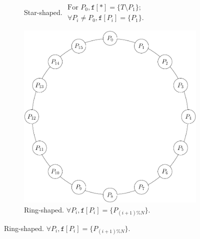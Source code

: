 \documentclass{article}
\begin{document}
\begin{figure}
\begin{subfigure}[t]{0.3\textwidth}
    \caption{Star-shaped.  \newline $\begin{array}{l} \mbox{For $P_0$}, \mathtt{f}[*] = \{T\setminus P_1\}; \\ \mbox{$\forall P_i\neq P_0$}, \mathtt{f}[P_i] = \{P_1\}. \end{array}$}
    \label{fig:star}
  \end{subfigure}
  \hfill
  \begin{subfigure}[t]{0.3\textwidth}
    \centering
    \includegraphics[width=\textwidth]{ring}
    \caption{Ring-shaped. \newline $\forall P_i, \mathtt{f}[P_i]=\{P_{(i+1)\%N}\}$.}
    \label{fig:ring}
  \end{subfigure}
\end{figure}%
\end{document}
